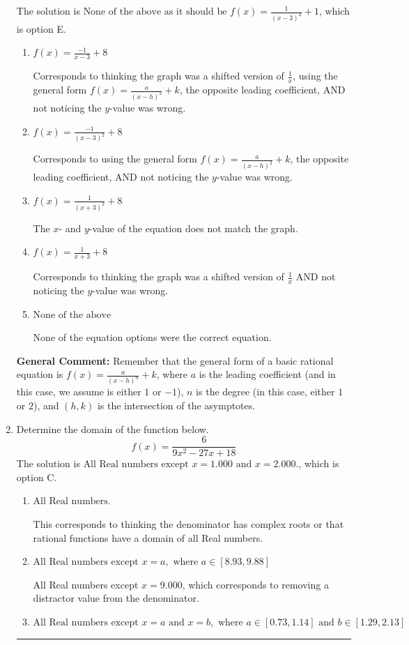 \documentclass{extbook}[14pt]
\newcommand{\litem}[1]{\item #1

\rule{\textwidth}{0.4pt}}
\begin{document}
\begin{enumerate}
{The solution is \( \text{None of the above as it should be } f(x) = \frac{1}{(x - 3)^2} + 1 \), which is option E.\begin{enumerate}[label=\Alph*.]
\item \( f(x) = \frac{-1}{x - 3} + 8 \)

Corresponds to thinking the graph was a shifted version of $\frac{1}{x}$, using the general form $f(x) = \frac{a}{(x-h)^2}+k$, the opposite leading coefficient, AND not noticing the $y$-value was wrong.
\item \( f(x) = \frac{-1}{(x - 3)^2} + 8 \)

Corresponds to using the general form $f(x) = \frac{a}{(x-h)^2}+k$, the opposite leading coefficient, AND not noticing the $y$-value was wrong.
\item \( f(x) = \frac{1}{(x + 3)^2} + 8 \)

The $x$- and $y$-value of the equation does not match the graph.
\item \( f(x) = \frac{1}{x + 3} + 8 \)

Corresponds to thinking the graph was a shifted version of $\frac{1}{x}$ AND not noticing the $y$-value was wrong.
\item \( \text{None of the above} \)

None of the equation options were the correct equation.
\end{enumerate}

\textbf{General Comment:} Remember that the general form of a basic rational equation is $ f(x) = \frac{a}{(x-h)^n} + k$, where $a$ is the leading coefficient (and in this case, we assume is either $1$ or $-1$), $n$ is the degree (in this case, either $1$ or $2$), and $(h, k)$ is the intersection of the asymptotes.
}
\litem{
Determine the domain of the function below.
\[ f(x) = \frac{6}{9x^{2} -27 x + 18} \]The solution is \( \text{All Real numbers except } x = 1.000 \text{ and } x = 2.000. \), which is option C.\begin{enumerate}[label=\Alph*.]
\item \( \text{All Real numbers.} \)

This corresponds to thinking the denominator has complex roots or that rational functions have a domain of all Real numbers.
\item \( \text{All Real numbers except } x = a, \text{ where } a \in [8.93, 9.88] \)

All Real numbers except $x = 9.000$, which corresponds to removing a distractor value from the denominator.
\item \( \text{All Real numbers except } x = a \text{ and } x = b, \text{ where } a \in [0.73, 1.14] \text{ and } b \in [1.29, 2.13] \)


\end{enumerate}}
\end{enumerate}
\end{document}
